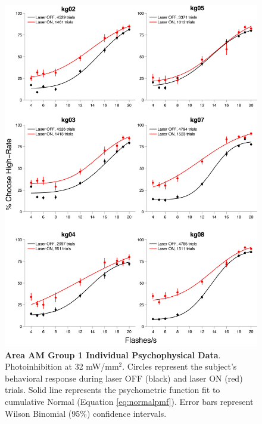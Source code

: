 \begin{figure}
  \centering
   \includegraphics[width=\textwidth,height=0.8\textheight]{Figures/chapter4/jaws_AM_group1_individualPMFs.png}
  \caption[Area AM Group 1 Individual Psychophysical Data]{\textbf{Area AM Group 1 Individual Psychophysical Data}. Photoinhibition at 32 mW/mm$^{2}$. Circles represent the subject's behavioral response during laser OFF (black) and laser ON (red) trials. Solid line represents the psychometric function fit to cumulative Normal (Equation \ref{eq:normalpmf}). Error bars represent Wilson Binomial (95\%) confidence intervals. }
   \label{fig:AMgroup1individual}
\end{figure}

